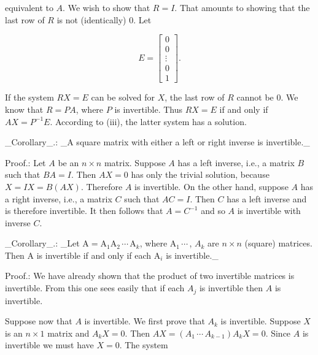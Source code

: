 equivalent to \(A\). We wish to show that \(R=I\). That amounts to showing that the last row of \(R\) is not (identically) 0. Let

\[E=\begin{bmatrix}0\\ 0\\ \vdots\\ 0\\ 1\end{bmatrix}.\]

If the system \(RX=E\) can be solved for \(X\), the last row of \(R\) cannot be 0. We know that \(R=PA\), where \(P\) is invertible. Thus \(RX=E\) if and only if \(AX=P^{-1}E\). According to (iii), the latter system has a solution.

_Corollary_.: _A square matrix with either a left or right inverse is invertible._

Proof.: Let \(A\) be an \(n\times n\) matrix. Suppose \(A\) has a left inverse, i.e., a matrix \(B\) such that \(BA=I\). Then \(AX=0\) has only the trivial solution, because \(X=IX=B(AX)\). Therefore \(A\) is invertible. On the other hand, suppose \(A\) has a right inverse, i.e., a matrix \(C\) such that \(AC=I\). Then \(C\) has a left inverse and is therefore invertible. It then follows that \(A=C^{-1}\) and so \(A\) is invertible with inverse \(C\).

_Corollary_.: _Let \(\mathrm{A}=\mathrm{A}_{1}\mathrm{A}_{2}\,\cdots\,\mathrm{A}_{k}\), where \(\mathrm{A}_{1}\,\cdots\,\), \(A_{k}\) are \(n\times n\) (square) matrices. Then \(\mathrm{A}\) is invertible if and only if each \(\mathrm{A}_{i}\) is invertible._

Proof.: We have already shown that the product of two invertible matrices is invertible. From this one sees easily that if each \(A_{j}\) is invertible then \(A\) is invertible.

Suppose now that \(A\) is invertible. We first prove that \(A_{k}\) is invertible. Suppose \(X\) is an \(n\times 1\) matrix and \(A_{k}X=0\). Then \(AX=(A_{1}\,\cdots\,A_{k-1})A_{k}X=0\). Since \(A\) is invertible we must have \(X=0\). The system 